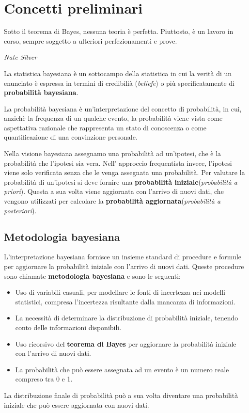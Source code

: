 \documentclass[../main.tex]{subfiles}
\begin{document}
\chapter{Concetti preliminari}
\epigraph{Sotto il teorema di Bayes, nessuna teoria è perfetta. Piuttosto, è un lavoro in corso, sempre soggetto a ulteriori perfezionamenti e prove.}{\textit{Nate Silver}}
\hfill \break
La statistica bayesiana è un sottocampo della statistica in cui la verità di un enunciato è espressa in termini di credibilià (\textit{beliefe})
o più specificatamente di \textbf{probabilità bayesiana}.
\begin{definition}
    \label{def:probabilità_bayesiana}
    La probabilità bayesiana è un'interpretazione del concetto di probabilità, in cui, anzichè la frequenza di un qualche evento, la probabilità
    viene vista come aspettativa razionale che rappresenta un stato di conoscenza o come quantificazione di una convinzione personale.
\end{definition}
\hfill \break
Nella visione bayesiana assegnamo una probabilità ad un'ipotesi, che è la probabilità che l'ipotesi sia vera.
Nell' approccio frequentista invece, l'ipotesi viene solo verificata senza che le venga assegnata una probabilità.
Per valutare la probabilità di un'ipotesi si deve fornire una \textbf{probabilità iniziale}(\textit{probabilità a priori}).
Questa a sua volta viene aggiornata con l'arrivo di nuovi dati, che vengono utilizzati per calcolare la \textbf{probabilità aggiornata}(\textit{probabilità a posteriori}).

\section{Metodologia bayesiana}
L'interpretazione bayesiana fornisce un insieme standard di procedure e formule per aggiornare la probabilità iniziale con l'arrivo di nuovi dati.
Queste procedure sono chiamate \textbf{metodologia bayesiana} e sono le seguenti:
\begin{itemize}
    \item Uso di variabili casuali, per modellare le fonti di incertezza nei modelli statistici, compresa l'incertezza risultante dalla mancanza di informazioni.
    \item La necessità di determinare la distribuzione di probabilità iniziale, tenendo conto delle informazioni disponibili.
    \item Uso ricorsivo del \textbf{teorema di Bayes} per aggiornare la probabilità iniziale con l'arrivo di nuovi dati.
    \item La probabilità che può essere assegnata ad un evento è un numero reale compreso tra 0 e 1.
\end{itemize}
La distribuzione finale di probabilità può a sua volta diventare una probabilità iniziale che può essere aggiornata con nuovi dati.
\end{document}
